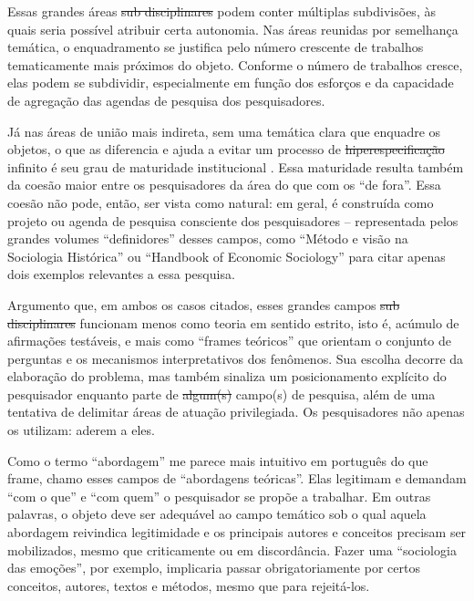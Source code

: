Essas grandes áreas \sout{sub disciplinares}
podem conter múltiplas subdivisões, às quais seria possível atribuir certa autonomia. Nas áreas reunidas por semelhança temática, o enquadramento se justifica pelo número crescente de trabalhos tematicamente mais próximos do objeto. Conforme o número de trabalhos cresce, elas podem se subdividir, especialmente em função dos esforços e da capacidade de agregação das agendas de pesquisa dos pesquisadores.

Já nas áreas de união mais indireta, sem uma temática clara que enquadre os objetos, o que as diferencia e ajuda
a evitar um processo de \sout{hiperespecificação} infinito
é seu grau de maturidade institucional . Essa maturidade resulta também da coesão maior entre os pesquisadores da área do que com os ``de fora''. Essa coesão não pode, então, ser vista como natural: em geral, é construída como projeto ou agenda de pesquisa consciente dos pesquisadores -- representada pelos grandes volumes ``definidores'' desses campos, como ``Método e visão
na Sociologia Histórica''  ou ``Handbook of Economic Sociology''  para citar apenas dois exemplos relevantes a essa pesquisa.

Argumento que, em ambos os casos citados, esses grandes campos \sout{sub disciplinares} funcionam menos como teoria em sentido estrito, isto é, acúmulo de afirmações testáveis, e mais
como ``frames teóricos''  que orientam o conjunto de perguntas e os mecanismos interpretativos dos fenômenos.
Sua escolha decorre da elaboração do problema, mas também sinaliza um posicionamento explícito do pesquisador
enquanto parte de \sout{algum(s)} campo(s) de pesquisa, além de uma tentativa de delimitar áreas de atuação privilegiada. Os pesquisadores não apenas os utilizam: aderem a eles.

Como o termo ``abordagem'' me parece mais intuitivo em português do que frame, chamo esses campos de ``abordagens teóricas''. Elas legitimam e demandam  ``com o que'' e ``com quem'' o pesquisador se propõe a trabalhar. Em outras palavras, o objeto deve ser adequável ao campo temático sob o qual aquela
abordagem reivindica legitimidade e os principais autores e conceitos precisam ser mobilizados, mesmo que criticamente ou em
discordância. Fazer uma ``sociologia das emoções'', por exemplo, implicaria passar obrigatoriamente por certos conceitos, autores, textos e métodos, mesmo que para rejeitá-los.

